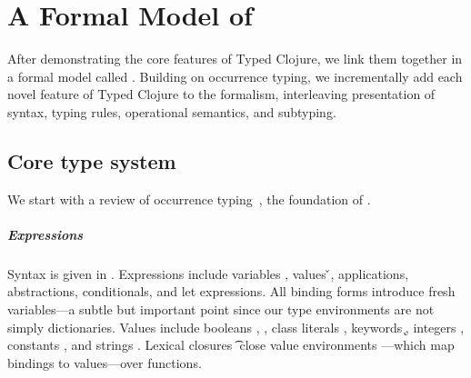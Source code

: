 \chapter{A Formal Model of \lambdatc{}}

\label{sec:formal}

After demonstrating the core features of Typed Clojure, 
we link them together in a formal model called
\lambdatc{}.
%
Building on occurrence typing,
we incrementally add each
novel feature of Typed Clojure to the formalism,
interleaving presentation of syntax, typing rules, operational semantics,
and subtyping.

\section{Core type system}
\label{sec:coretypesystem}

We start with a review of
occurrence typing~\cite{TF10}, the foundation of \lambdatc{}.

\paragraph{Expressions} Syntax is given in . Expressions \e{} 
include variables \x{}, values \v{},
applications, abstractions, conditionals, and let expressions.
All binding forms introduce fresh variables---a subtle but important point since our type environments
are not simply dictionaries.
Values include booleans \bool{}, \nil{}, class literals {\class{}}, keywords \k{},
integers {\nat{}},
constants {\const{}}, and strings \str{}. Lexical closures {\closure {\openv{}} {\abs {\x{}} {\t{}} {\e{}}}}
close value environments \openv{}---which map bindings to values---over functions.

